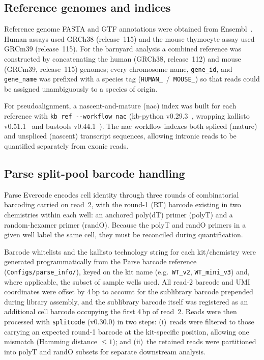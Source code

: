 \subsection{Reference genomes and indices}

Reference genome FASTA and GTF annotations were obtained from Ensembl~\cite{ensembl}. Human assays
used GRCh38 (release~115) and the mouse thymocyte assay used GRCm39 (release~115).
For the barnyard analysis a combined reference was constructed by concatenating the
human (GRCh38, release~112) and mouse (GRCm39, release~115) genomes; every chromosome
name, \texttt{gene\_id}, and \texttt{gene\_name} was prefixed with a species tag
(\texttt{HUMAN\_}~/~\texttt{MOUSE\_}) so that reads could be assigned unambiguously to
a species of origin.

For pseudoalignment, a nascent-and-mature (nac) index was built for each reference
with \texttt{kb ref -{}-workflow nac} (kb-python v0.29.3~\cite{sullivan2023kb},
wrapping kallisto v0.51.1~\cite{bray2016kallisto} and bustools
v0.44.1~\cite{melsted2021bustools}). The nac workflow indexes both spliced (mature)
and unspliced
(nascent) transcript sequences, allowing intronic reads to be quantified separately
from exonic reads.

\subsection{Parse split-pool barcode handling}

Parse Evercode encodes cell identity through three rounds of combinatorial barcoding
carried on read~2, with the round-1 (RT) barcode existing in two chemistries within
each well: an anchored poly(dT) primer (polyT) and a random-hexamer primer (randO).
Because the polyT and randO primers in a given well label the same cell, they must
be reconciled during quantification.

Barcode whitelists and the kallisto technology string for each kit/chemistry were
generated programmatically from the Parse barcode reference
(\texttt{Configs/parse\_info/}), keyed on the kit name (e.g.\ \texttt{WT\_v2},
\texttt{WT\_mini\_v3}) and, where applicable, the subset of sample wells used. All
read-2 barcode and UMI coordinates were offset by 4\,bp to account for the sublibrary
barcode prepended during library assembly, and the sublibrary barcode itself was
registered as an additional cell barcode occupying the first 4\,bp of read~2. Reads
were then processed with \texttt{splitcode} (v0.30.0) in two steps: (i)~reads were
filtered to those carrying an expected round-1 barcode at the kit-specific position,
allowing one mismatch (Hamming distance $\leq 1$); and (ii)~the retained reads were
partitioned into polyT and randO subsets for separate downstream analysis.


